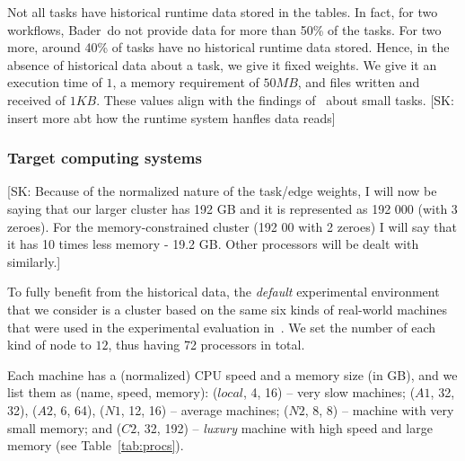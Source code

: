 \documentclass[conference]{IEEEtran}
\newcommand{\skug}[1]{{\color{blue}[SK: #1]}}
\begin{document}
    Not all tasks have historical runtime data stored in the tables.
    In fact, for two workflows, Bader~\etal do not provide data for more than 50\% of the tasks.
    For two more, around 40\% of tasks have no historical runtime data stored.
    Hence, in the absence of historical data about a task, we give it fixed weights.
    We give it an execution time of $1$, a memory requirement of $50 MB$, and files written and received of $1KB$.
    These values align with the findings of~\cite{lotaru} about small tasks.
%
    \skug{insert more abt how the runtime system hanfles data reads}

    \subsubsection{Target computing systems}
    \skug{Because of the normalized nature of the task/edge weights, I will now be saying that our larger cluster has 192 GB and it
    is represented as 192 000 (with 3 zeroes). For the memory-constrained cluster (192 00 with 2 zeroes) I will say that it has 10 times
    less memory - 19.2 GB. Other processors will be dealt with similarly.}

    To fully benefit from the historical data, the  {\em default} experimental environment
    that we consider is a cluster based on the same six
    kinds of real-world machines that were used in the experimental evaluation in~\cite{lotaru}.
    We set the number of each kind of node to $12$, thus having 72 processors in total. %

    Each machine has a (normalized) CPU speed and a memory size (in GB), and we list them as (name, speed, memory):
    ($local$, 4, 16) -- very slow machines; ($A1$, 32, 32), ($A2$, 6, 64), ($N1$, 12, 16) -- average machines;
    ($N2$, 8, 8) -- machine with very small memory; and ($C2$, 32, 192) -- {\em luxury} machine with high speed and
    large memory (see Table~\ref{tab:procs}).
\end{document}
